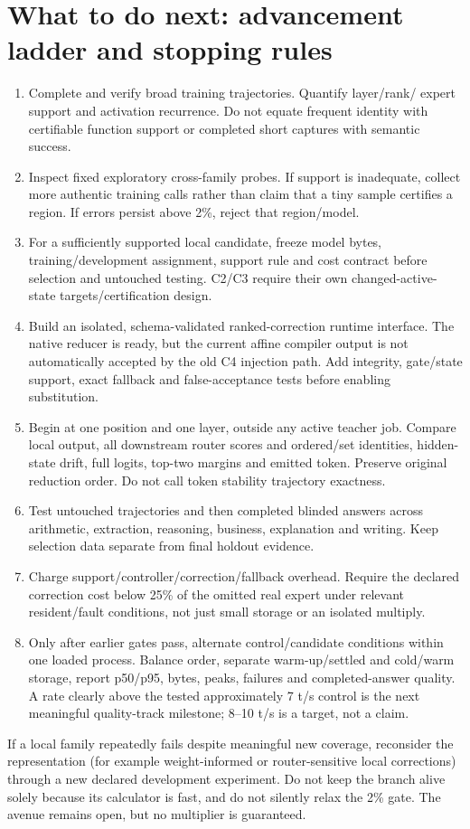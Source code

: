 \documentclass[11pt,a4paper]{article}
\begin{document}
\section{What to do next: advancement ladder and stopping rules}
\begin{enumerate}
\item Complete and verify broad training trajectories. Quantify layer/rank/
expert support and activation recurrence. Do not equate frequent identity with
certifiable function support or completed short captures with semantic success.
\item Inspect fixed exploratory cross-family probes. If support is inadequate,
collect more authentic training calls rather than claim that a tiny sample
certifies a region. If errors persist above 2\%, reject that region/model.
\item For a sufficiently supported local candidate, freeze model bytes,
training/development assignment, support rule and cost contract before
selection and untouched testing. C2/C3 require their own changed-active-state
targets/certification design.
\item Build an isolated, schema-validated ranked-correction runtime interface.
The native reducer is ready, but the current affine compiler output is not
automatically accepted by the old C4 injection path. Add integrity, gate/state
support, exact fallback and false-acceptance tests before enabling substitution.
\item Begin at one position and one layer, outside any active teacher job.
Compare local output, all downstream router scores and ordered/set identities,
hidden-state drift, full logits, top-two margins and emitted token. Preserve
original reduction order. Do not call token stability trajectory exactness.
\item Test untouched trajectories and then completed blinded answers across
arithmetic, extraction, reasoning, business, explanation and writing. Keep
selection data separate from final holdout evidence.
\item Charge support/controller/correction/fallback overhead. Require the
declared correction cost below 25\% of the omitted real expert under relevant
resident/fault conditions, not just small storage or an isolated multiply.
\item Only after earlier gates pass, alternate control/candidate conditions
within one loaded process. Balance order, separate warm-up/settled and
cold/warm storage, report p50/p95, bytes, peaks, failures and completed-answer
quality. A rate clearly above the tested approximately 7 t/s control is the
next meaningful quality-track milestone; 8--10 t/s is a target, not a claim.
\end{enumerate}
If a local family repeatedly fails despite meaningful new coverage, reconsider
the representation (for example weight-informed or router-sensitive local
corrections) through a new declared development experiment. Do not keep the
branch alive solely because its calculator is fast, and do not silently relax
the 2\% gate. The avenue remains open, but no multiplier is guaranteed.
\end{document}

